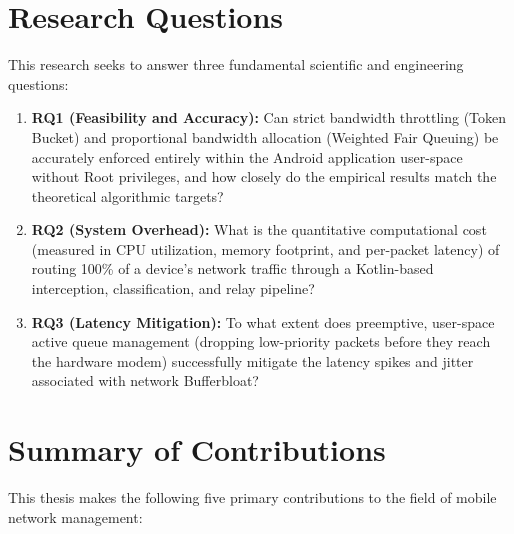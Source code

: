 \section{Research Questions}
\label{sec:rqs}

This research seeks to answer three fundamental scientific and engineering questions:

\begin{enumerate}
    \item \textbf{RQ1 (Feasibility and Accuracy):} Can strict bandwidth throttling (Token Bucket) and proportional bandwidth allocation (Weighted Fair Queuing) be accurately enforced entirely within the Android application user-space without Root privileges, and how closely do the empirical results match the theoretical algorithmic targets?
    \item \textbf{RQ2 (System Overhead):} What is the quantitative computational cost (measured in CPU utilization, memory footprint, and per-packet latency) of routing 100\% of a device's network traffic through a Kotlin-based interception, classification, and relay pipeline?
    \item \textbf{RQ3 (Latency Mitigation):} To what extent does preemptive, user-space active queue management (dropping low-priority packets before they reach the hardware modem) successfully mitigate the latency spikes and jitter associated with network Bufferbloat?
\end{enumerate}

\section{Summary of Contributions}
\label{sec:contributions}

This thesis makes the following five primary contributions to the field of mobile network management:

